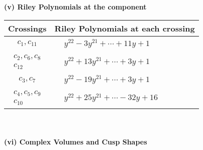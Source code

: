 \documentclass[1p]{elsarticle_modified}
\theoremstyle{definition}
\begin{document}
\newpage\renewcommand{\arraystretch}{1}
\flushleft \textbf{(v) Riley Polynomials at the component}\newline \\
\begin{tabular}{m{50pt}|m{274pt}}
Crossings & \hspace{64pt}Riley Polynomials at each crossing \\
\hline $$\begin{aligned}c_{1},c_{11}\end{aligned}$$&$\begin{aligned}
&y^{22}-3 y^{21}+\cdots+11 y+1
\end{aligned}$\\
\hline $$\begin{aligned}c_{2},c_{6},c_{8}\\c_{12}\end{aligned}$$&$\begin{aligned}
&y^{22}+13 y^{21}+\cdots+3 y+1
\end{aligned}$\\
\hline $$\begin{aligned}c_{3},c_{7}\end{aligned}$$&$\begin{aligned}
&y^{22}-19 y^{21}+\cdots+3 y+1
\end{aligned}$\\
\hline $$\begin{aligned}c_{4},c_{5},c_{9}\\c_{10}\end{aligned}$$&$\begin{aligned}
&y^{22}+25 y^{21}+\cdots-32 y+16
\end{aligned}$\\
\hline
\end{tabular}\\~\\
\newpage\flushleft \textbf{(vi) Complex Volumes and Cusp Shapes}
\end{document}
